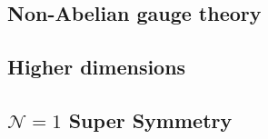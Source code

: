 \subsection{Non-Abelian gauge theory}
\subsection{Higher dimensions}
\subsection{$\mathcal{N}=1$ Super Symmetry}


